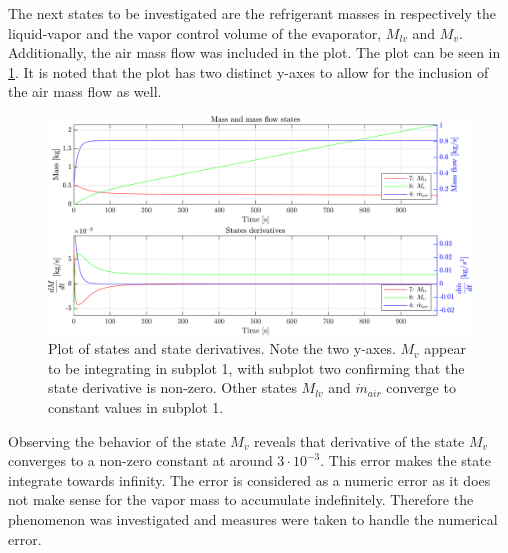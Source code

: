 The next states to be investigated are the refrigerant masses in respectively the liquid-vapor and the vapor control volume of the evaporator, $ M_{lv} $ and $ M_v $. Additionally, the air mass flow was included in the plot. The plot can be seen in \cref{fig:non_lin_sim_Mass_Mvfucked}. It is noted that the plot has two distinct y-axes to allow for the inclusion of the air mass flow as well.
\begin{figure}[h]
	\centering
	\includegraphics[width=1\textwidth]{Graphics/nonlin_sim_Mass_Mvfucked.png}
	\caption{Plot of states and state derivatives. Note the two y-axes. $ M_v $ appear to be integrating in subplot 1, with subplot two confirming that the state derivative is non-zero. Other states $ M_{lv} $ and $ \dot{m}_{air} $ converge to constant values in subplot 1.}
	\label{fig:non_lin_sim_Mass_Mvfucked}
\end{figure}
Observing the behavior of the state $ M_v $ reveals that  derivative of the state $M_v$ converges to a non-zero constant at around $ 3\cdot 10^{-3} $. This error makes the state integrate towards infinity. The error is considered as a numeric error as it does not make sense for the vapor mass to accumulate indefinitely. Therefore the phenomenon was investigated and measures were taken to handle the numerical error. 

